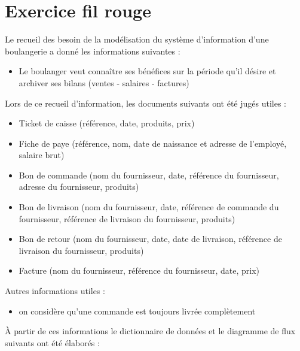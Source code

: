 \section*{Exercice fil rouge}

Le recueil des besoin de la modélisation du système d'information d'une boulangerie a donné les informations suivantes :

\begin{itemize}
    \item Le boulanger veut connaître ses bénéfices sur la période qu'il désire et archiver ses bilans (ventes - salaires - factures)
\end{itemize}

Lors de ce recueil d'information, les documents suivants ont été jugés utiles :

\begin{itemize}
    \item Ticket de caisse (référence, date, produits, prix)
    \item Fiche de paye (référence, nom, date de naissance et adresse de l'employé, salaire brut)
    \item Bon de commande (nom du fournisseur, date, référence du fournisseur, adresse du fournisseur, produits)
    \item Bon de livraison (nom du fournisseur, date, référence de commande du fournisseur, référence de livraison du fournisseur, produits)
    \item Bon de retour (nom du fournisseur, date, date de livraison, référence de livraison du fournisseur, produits)
    \item Facture (nom du fournisseur, référence du fournisseur, date, prix) \\
\end{itemize}

Autres informations utiles :

\begin{itemize}
    \item on considère qu'une commande est toujours livrée complètement
\end{itemize}


À partir de ces informations le dictionnaire de données et le diagramme de flux suivants ont été élaborés :\\


